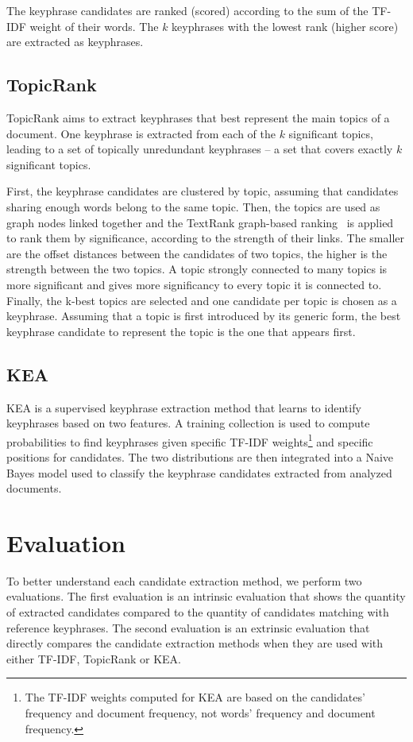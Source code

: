     The keyphrase candidates are ranked (scored) according to the sum of the
    TF-IDF weight of their words. The $k$ keyphrases with the lowest rank
    (higher score) are extracted as keyphrases.

  \subsection{TopicRank}
  \label{subsec:topicrank}
    TopicRank aims to extract keyphrases that best represent the main topics of
    a document. One keyphrase is extracted from each of the $k$ significant
    topics, leading to a set of topically unredundant keyphrases -- a set that
    covers exactly $k$ significant topics.

    First, the keyphrase candidates are clustered by topic, assuming that
    candidates sharing enough words belong to the same topic. Then, the topics
    are used as graph nodes linked together and the TextRank graph-based
    ranking~\cite{mihalcea2004textrank} is applied to rank them by significance,
    according to the strength of their links. The smaller are the offset
    distances between the candidates of two topics, the higher is the strength
    between the two topics. A topic strongly connected to many topics is more
    significant and gives more significancy to every topic it is connected to.
    Finally, the k-best topics are selected and one candidate per topic is
    chosen as a keyphrase. Assuming that a topic is first introduced by its
    generic form, the best keyphrase candidate to represent the topic is the one
    that appears first.

  \subsection{KEA}
  \label{subsec:kea}
    KEA is a supervised keyphrase extraction method that learns to identify
    keyphrases based on two features. A training collection is used to compute
    probabilities to find keyphrases given specific TF-IDF weights\footnote{The
    TF-IDF weights computed for KEA are based on the candidates' frequency and
    document frequency, not words' frequency and document frequency.} and
    specific positions for candidates. The two distributions are then integrated
    into a Naive Bayes model used to classify the keyphrase candidates extracted
    from analyzed documents.

\section{Evaluation}
\label{sec:evaluation}
  To better understand each candidate extraction method, we perform two
  evaluations. The first evaluation is an intrinsic evaluation that shows the
  quantity of extracted candidates compared to the quantity of candidates
  matching with reference keyphrases. The second evaluation is an extrinsic
  evaluation that directly compares the candidate extraction methods when they
  are used with either TF-IDF, TopicRank or KEA.

